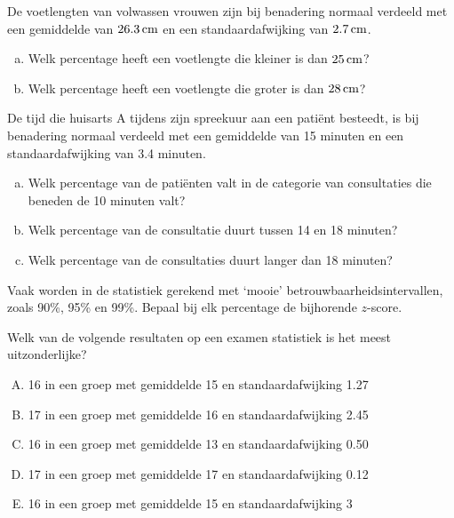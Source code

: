 \documentclass[a4paper,12pt, twoside]{article}
\begin{document}
\begin{oefening}
De voetlengten van volwassen vrouwen zijn bij benadering normaal verdeeld met een gemiddelde van $26.3 \cm$ en een standaardafwijking van $2.7 \cm$.
\begin{enumerate}[(a)]
  \item Welk percentage heeft een voetlengte die kleiner is dan $25 \cm$?
  \item Welk percentage heeft een voetlengte die groter is dan $28 \cm$?
\end{enumerate}
\end{oefening}

\begin{oefening}
De tijd die huisarts A tijdens zijn spreekuur aan een patiënt besteedt, is bij benadering normaal verdeeld met een gemiddelde van 15 minuten en een standaardafwijking van 3.4 minuten.
\begin{enumerate}[(a)]
  \item Welk percentage van de patiënten valt in de categorie van consultaties die beneden de 10 minuten valt?
  \item Welk percentage van de consultatie duurt tussen 14 en 18 minuten?
  \item Welk percentage van de consultaties duurt langer dan 18 minuten?
\end{enumerate}
\end{oefening}

\begin{oefening}
Vaak worden in de statistiek gerekend met ‘mooie’ betrouwbaarheidsintervallen, zoals 90\%, 95\% en 99\%. Bepaal bij elk percentage de bijhorende $z$-score.
\end{oefening}

\begin{oefening}
Welk van de volgende resultaten op een examen statistiek is het meest uitzonderlijke?
\begin{enumerate}[(A)]
  \item 16 in een groep met gemiddelde 15 en standaardafwijking 1.27
  \item 17 in een groep met gemiddelde 16 en standaardafwijking 2.45
  \item 16 in een groep met gemiddelde 13 en standaardafwijking 0.50
  \item 17 in een groep met gemiddelde 17 en standaardafwijking 0.12
  \item 16 in een groep met gemiddelde 15 en standaardafwijking 3
\end{enumerate}
\end{oefening}
\end{document}
